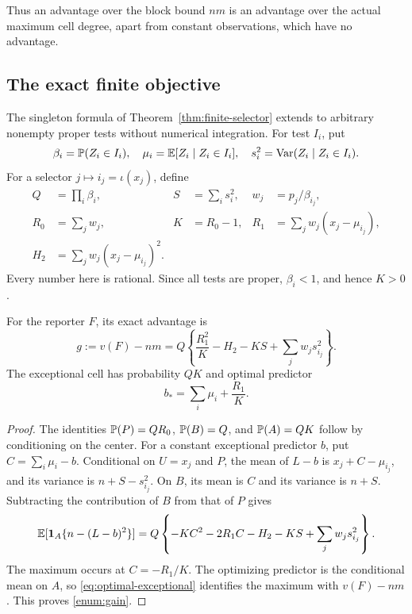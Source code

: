 Thus an advantage over the block bound \(nm\) is an advantage over
the actual maximum cell degree, apart from constant observations,
which have no advantage.

\subsection{The exact finite objective}

The singleton formula of Theorem~\ref{thm:finite-selector} extends
to arbitrary nonempty proper tests without numerical integration.
For test \(I_i\), put
\[
 \beta_i=\mathbb P(Z_i\in I_i),\quad
 \mu_i=\mathbb E[Z_i\mid Z_i\in I_i],\quad
 s_i^2=\operatorname{Var}(Z_i\mid Z_i\in I_i).
\]
For a selector \(j\mapsto i_j=\iota(x_j)\), define
\begin{align*}
 Q&=\prod_i\beta_i,& S&=\sum_i s_i^2,&
 w_j&=p_j/\beta_{i_j},\\
 R_0&=\sum_jw_j,& K&=R_0-1,&
 R_1&=\sum_jw_j(x_j-\mu_{i_j}),\\
 H_2&=\sum_jw_j(x_j-\mu_{i_j})^2.&&&&
\end{align*}
Every number here is rational. Since all tests are proper,
\(\beta_i<1\), and hence \(K>0\).

\begin{proposition}
\label{enum:objective}
For the reporter \(F\), its exact advantage is
\begin{equation}\label{enum:gain}
 g:=v(F)-nm
 =Q\left\{\frac{R_1^2}{K}-H_2-KS+
               \sum_j w_j s_{i_j}^2\right\}.
\end{equation}
The exceptional cell has probability \(QK\) and optimal predictor
\[
 b_* = \sum_i\mu_i+\frac{R_1}{K}.
\]
\end{proposition}

\begin{proof}
The identities \(\mathbb P(P)=QR_0\), \(\mathbb P(B)=Q\), and
\(\mathbb P(A)=QK\) follow by conditioning on the center.
For a constant exceptional predictor \(b\), put
\(C=\sum_i\mu_i-b\). Conditional on \(U=x_j\) and \(P\), the
mean of \(L-b\) is \(x_j+C-\mu_{i_j}\), and its variance is
\(n+S-s_{i_j}^2\). On \(B\), its mean is \(C\) and its variance
is \(n+S\). Subtracting the contribution of \(B\) from that of
\(P\) gives
\[
 \mathbb E[\mathbf 1_A\{n-(L-b)^2\}]
 =Q\left\{-KC^2-2R_1C-H_2-KS+
                       \sum_jw_js_{i_j}^2\right\}.
\]
The maximum occurs at \(C=-R_1/K\). The optimizing predictor is
the conditional mean on \(A\), so
\eqref{eq:optimal-exceptional} identifies the maximum with
\(v(F)-nm\). This proves \eqref{enum:gain}.
\end{proof}

